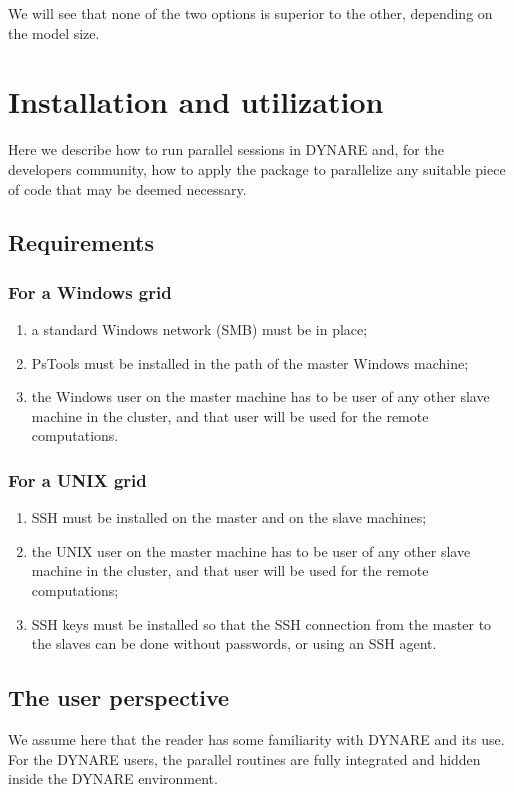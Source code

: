 \documentclass[12pt,a4paper,pdftex]{article}
\begin{document}
We will see that none of the two options is superior to the other, depending on the model size.


\section{Installation and utilization}
Here we describe how to run parallel sessions in DYNARE and, for the developers community, how to apply the package to parallelize any suitable piece of code that may be deemed necessary.

\subsection{Requirements}

\subsubsection{For a Windows grid}
\begin{enumerate}
\item a standard Windows network (SMB) must be in place;
\item PsTools \citep{PsTools} must be installed in the path of the master Windows machine;
\item the Windows user on the master machine has to be user of any other slave machine in the cluster, and that user will be used for the remote computations.
\end{enumerate}

\subsubsection{For a UNIX grid}
\begin{enumerate}
\item SSH must be installed on the master and on the slave machines;
\item the UNIX user on the master machine has to be user of any other slave machine in the cluster, and that user will be used for the remote computations;
\item SSH keys must be installed so that the SSH connection from the master to the slaves can be done without passwords, or using an SSH agent.
\end{enumerate}

\subsection{The user perspective}
We assume here that the reader has some familiarity with DYNARE and its use. For the DYNARE users, the parallel routines are fully integrated and hidden inside the DYNARE environment.
\end{document}
